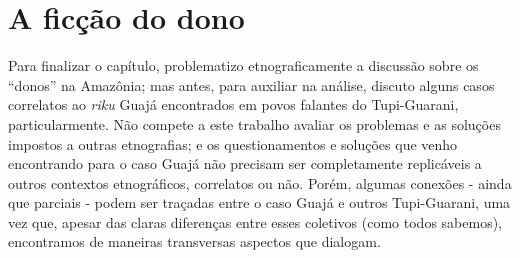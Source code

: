 \section{A ficção do dono}

Para finalizar o capítulo, problematizo etnograficamente a discussão
sobre os ``donos'' na Amazônia; mas antes, para auxiliar na análise,
discuto alguns casos correlatos ao \emph{riku} Guajá encontrados em
povos falantes do Tupi-Guarani, particularmente. Não compete a este
trabalho avaliar os problemas e as soluções impostos a outras
etnografias; e os questionamentos e soluções que venho encontrando para
o caso Guajá não precisam ser completamente replicáveis a outros
contextos etnográficos, correlatos ou não. Porém, algumas conexões -
ainda que parciais - podem ser traçadas entre o caso Guajá e outros
Tupi-Guarani, uma vez que, apesar das claras diferenças entre esses
coletivos (como todos sabemos), encontramos de maneiras transversas
aspectos que dialogam.

